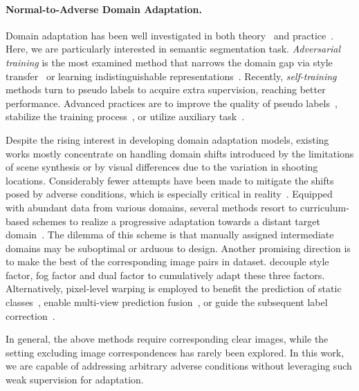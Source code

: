 \documentclass[letterpaper]{article} \usepackage{aaai23}  \usepackage{times}  \usepackage{helvet}  \usepackage{courier}  \usepackage[hyphens]{url}  \usepackage{graphicx} \urlstyle{rm} \def\UrlFont{\rm}  \usepackage{natbib}  \usepackage{caption} \frenchspacing  \setlength{\pdfpagewidth}{8.5in}  \setlength{\pdfpageheight}{11in}  \usepackage{algorithm}
\begin{document}
\paragraph{Normal-to-Adverse Domain Adaptation.} Domain adaptation has been well investigated in both theory~\cite{ben2010theory} and practice~\cite{WangD18}. Here, we are particularly interested in semantic segmentation task. \textit{Adversarial training} is the most examined method that narrows the domain gap via style transfer~\cite{hoffman2018cycada} or learning indistinguishable representations~\cite{tsai2018learning,vu2019advent,kim2020learning}. Recently, \textit{self-training} methods turn to pseudo labels to acquire extra supervision, reaching better performance. Advanced practices are to improve the quality of pseudo labels~\cite{zou2018unsupervised,zou2019confidence}, stabilize the training process~\cite{tranheden2021dacs,lukas2021daformer}, or utilize auxiliary task~\cite{wang2021domain,xie2022sepico}.

Despite the rising interest in developing domain adaptation models, existing works mostly concentrate on handling domain shifts introduced by the limitations of scene synthesis or by visual differences due to the variation in shooting locations. Considerably fewer attempts have been made to mitigate the shifts posed by adverse conditions, which is especially critical in reality~\cite{sakaridis2021acdc,liu2022image}.
Equipped with abundant data from various domains, several methods resort to curriculum-based schemes to realize a progressive adaptation towards a distant target domain~\cite{wulfmeier2018incremental,sakaridis2018model}. The dilemma of this scheme is that manually assigned intermediate domains may be suboptimal or arduous to design. Another promising direction is to make the best of the corresponding image pairs in dataset.
\citet{ma2022both} decouple style factor, fog factor and dual factor to cumulatively adapt these three factors. Alternatively, pixel-level warping is employed to benefit the prediction of static classes~\cite{wu2021one}, enable multi-view prediction fusion~\cite{sakaridis2020map}, or guide the subsequent label correction~\cite{bruggemann2022refign}. 

In general, the above methods require corresponding clear images, while the setting excluding image correspondences has rarely been explored. In this work, we are capable of addressing arbitrary adverse conditions without leveraging such weak supervision for adaptation.
\end{document}

